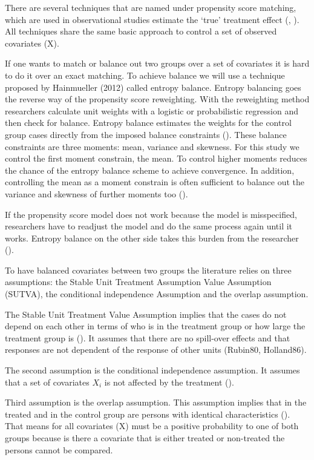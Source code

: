 There are several techniques that are named under propensity score matching, which are used in observational studies estimate the `true' treatment effect (\cite{Atonjietal05}, \cite{Morgan01}). All techniques share the same basic approach to control a set of observed covariates (X).

If one wants to match or balance out two groups over a set of covariates it is hard to do it over an exact matching. To achieve balance we will use a technique proposed by Hainmueller (2012) called entropy balance. Entropy balancing goes the reverse way of the propensity score reweighting. With the reweighting method researchers calculate unit weights with a logistic or probabilistic regression and then check for balance. Entropy balance estimates the weights for the control group cases directly from the imposed balance constraints (\cite{Hainmueller12}). These balance constraints are three moments: mean, variance and skewness. For this study we control the first moment constrain, the mean. To control higher moments reduces the chance of the entropy balance scheme to achieve convergence. In addition, controlling the mean as a moment constrain is often sufficient to balance out the variance and skewness of further moments too (\cite{Hainmuelleretal13}).

If the propensity score model does not work because the model is misspecified, researchers have to readjust the model and do the same process again until it works. Entropy balance on the other side takes this burden from the researcher (\cite{Hainmueller12}).

To have balanced covariates between two groups the literature relies on three assumptions: the Stable Unit Treatment Assumption Value Assumption (SUTVA), the conditional independence Assumption and the overlap assumption.

The Stable Unit Treatment Value Assumption implies that the cases do not depend on each other in terms of who is in the treatment group or how large the treatment group is (\cite{Eckmanetal15a}). It assumes that there are no spill-over effects and that responses are not dependent of the response of other units (Rubin80, Holland86).

The second assumption is the conditional independence assumption. It assumes that a set of covariates \(X_{i}\) is not affected by the treatment (\cite{Caliendoetal08}).

Third assumption is the overlap assumption. This assumption implies that in the treated and in the control group are persons with identical characteristics (\cite{Heckmanetal98}). That means for all covariates (X) must be a positive probability to one of both groups because is there a covariate that is either treated or non-treated the persons cannot be compared.

